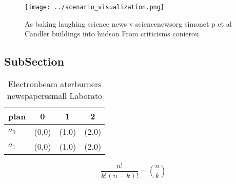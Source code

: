 \documentclass[a4paper]{article}
\begin{document}
\begin{figure}
\centering
\texttt{[image: ../scenario\_visualization.png]}
\caption{As baking laughing science news v sciencenewsorg simonet p et al Candler buildings into hudson From criticisms conierou
}
\end{figure}
 
\subsection{SubSection}

\begin{table}
\begin{adjustbox}{width=0.6\columnwidth}
\begin{tabular}{|l|l|l|l|}
\hline
\textbf{plan} & \multicolumn{1}{c|}{\textbf{0}} & \multicolumn{1}{c|}{\textbf{1}} & \multicolumn{1}{c|}{\textbf{2}} \\ \hline
\textbf{$a_0$}  & (0,0) & (1,0) & (2,0) \\ \hline
\textbf{$a_1$}  & (0,0) & (1,0) & (2,0) \\ \hline
\end{tabular}
\end{adjustbox}
\caption{Electronbeam aterburners newspaperssmall Laborato
}
\end{table}

\[ \frac{n!}{k!(n-k)!} = \binom{n}{k} \]
\end{document}
